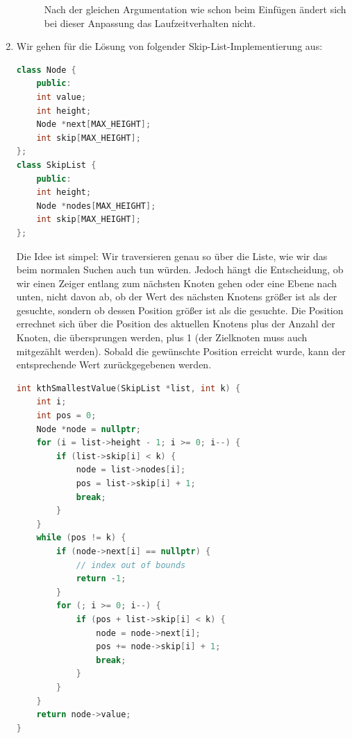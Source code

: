 \documentclass[11pt,a4paper]{article}
\begin{document}
\begin{loesung}
\begin{enumerate}
\begin{description}
            Nach der gleichen Argumentation wie schon beim Einfügen ändert sich bei dieser Anpassung das Laufzeitverhalten nicht.
        \end{description}
        \item Wir gehen für die Lösung von folgender Skip-List-Implementierung aus:
        \begin{lstlisting}[language=c++]
class Node {
    public:
    int value;
    int height;
    Node *next[MAX_HEIGHT];
    int skip[MAX_HEIGHT];
};
class SkipList {
    public:
    int height;
    Node *nodes[MAX_HEIGHT];
    int skip[MAX_HEIGHT];
};
        \end{lstlisting}
        Die Idee ist simpel:
        Wir traversieren genau so über die Liste, wie wir das beim normalen Suchen auch tun würden.
        Jedoch hängt die Entscheidung, ob wir einen Zeiger entlang zum nächsten Knoten gehen oder eine Ebene nach unten, nicht davon ab, ob der Wert des nächsten Knotens größer ist als der gesuchte, sondern ob dessen Position größer ist als die gesuchte.
        Die Position errechnet sich über die Position des aktuellen Knotens plus der Anzahl der Knoten, die übersprungen werden, plus 1 (der Zielknoten muss auch mitgezählt werden).
        Sobald die gewünschte Position erreicht wurde, kann der entsprechende Wert zurückgegebenen werden.
        \begin{lstlisting}[language=c++]
int kthSmallestValue(SkipList *list, int k) {
    int i;
    int pos = 0;
    Node *node = nullptr;
    for (i = list->height - 1; i >= 0; i--) {
        if (list->skip[i] < k) {
            node = list->nodes[i];
            pos = list->skip[i] + 1;
            break;
        }
    }
    while (pos != k) {
        if (node->next[i] == nullptr) {
            // index out of bounds
            return -1;
        }
        for (; i >= 0; i--) {
            if (pos + list->skip[i] < k) {
                node = node->next[i];
                pos += node->skip[i] + 1;
                break;
            }
        }
    }
    return node->value;
}
        \end{lstlisting}
    \end{enumerate}
\end{loesung}
\end{document}
